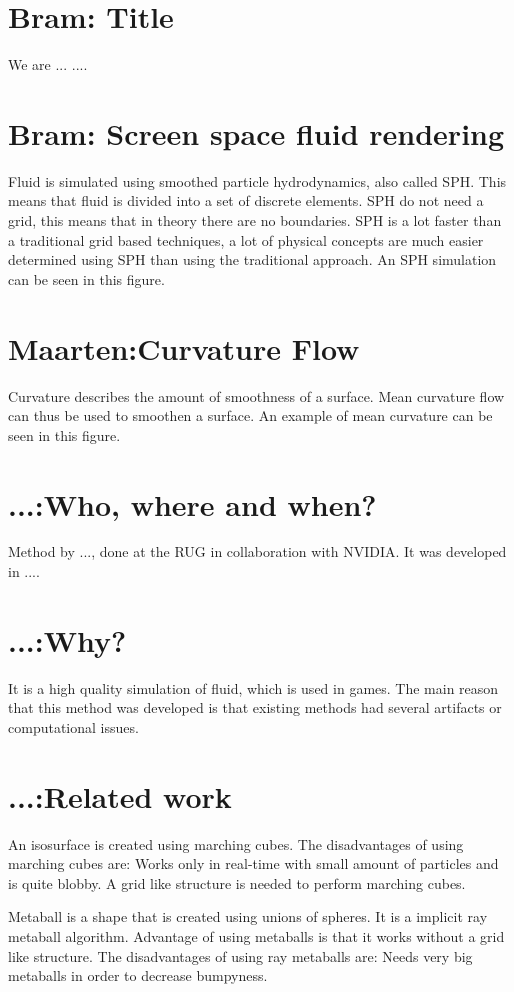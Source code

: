 \documentclass{article}
\begin{document}
\section{Bram: Title}

We are ... .... 
\section{Bram: Screen space fluid rendering}
Fluid is simulated using smoothed particle hydrodynamics, also called SPH.
This means that fluid is divided into a set of discrete elements.
SPH do not need a grid, this means that in theory there are no boundaries.
SPH is a lot faster than a traditional grid based techniques, a lot of physical concepts are much easier determined using SPH than using the traditional approach. 
An SPH simulation can be seen in this figure.

\section{Maarten:Curvature Flow}
Curvature describes the amount of smoothness of a surface.
Mean curvature flow can thus be used to smoothen a surface.
An example of mean curvature can be seen in this figure.

\section{...:Who, where and when?}
Method by ..., done at the RUG in collaboration with NVIDIA. 
It was developed in ....

\section{...:Why?}
It is a high quality simulation of fluid, which is used in games.
The main reason that this method was developed is that existing methods had several artifacts or computational issues.

\section{...:Related work}
An isosurface is created using marching cubes.
The disadvantages of using marching cubes are:
Works only in real-time with small amount of particles and is quite blobby.
A grid like structure is needed to perform marching cubes.


Metaball is a shape that is created using unions of spheres.
It is a implicit ray metaball algorithm.
Advantage of using metaballs is that it works without a grid like structure.
The disadvantages of using ray metaballs are:
Needs very big metaballs in order to decrease bumpyness.
\end{document}
